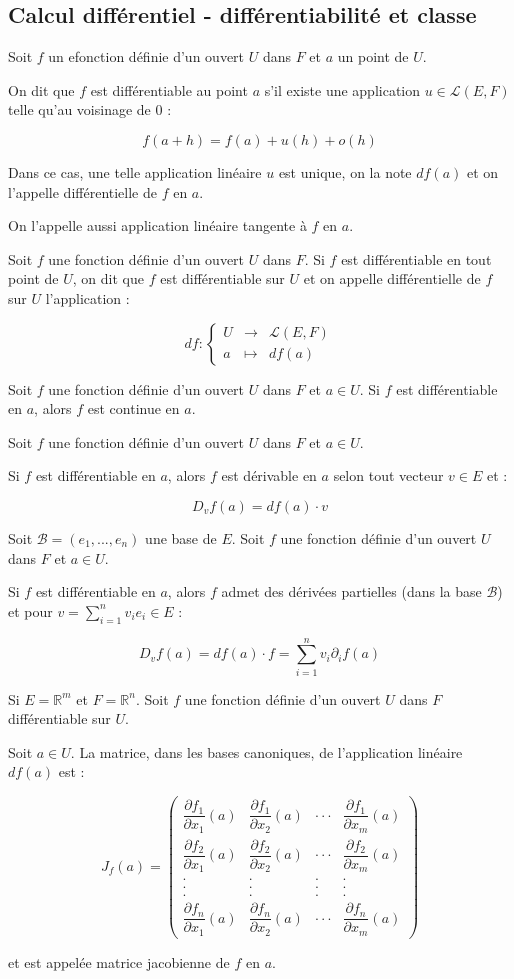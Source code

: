 \documentclass[a4paper,12pt]{book}
\newcommand{\Def}[2]{\begin{tcolorbox}[colback=white,colframe=red!10!green!20!blue!75!, title=Définition : #1]#2\end{tcolorbox}}
\newcommand{\Thr}[2]{\begin{tcolorbox}[sharp corners, colback=white,colframe=red!10!blue!30!green!75!, title=Théorème : #1]#2\end{tcolorbox}}
\def\R{\mathbb{R}}
\begin{document}
\subsection{Calcul différentiel - différentiabilité et classe}
\Def{}{Soit $f$ un efonction définie d'un ouvert $U$ dans $F$ et $a$ un point de $U$.
\par On dit que $f$ est différentiable au point $a$ s'il existe une application $u\in\mathcal{L}(E,F)$ telle qu'au voisinage de $0$ :
\par $$f(a+h) = f(a) + u(h) + o(h)$$
\par Dans ce cas, une telle application linéaire $u$ est unique, on la note $df(a)$ et on l'appelle différentielle de $f$ en $a$.
\par On l'appelle aussi application linéaire tangente à $f$ en $a$.}
\Def{}{Soit $f$ une fonction définie d'un ouvert $U$ dans $F$. Si $f$ est différentiable en tout point de $U$, on dit que $f$ est différentiable sur $U$ et on appelle différentielle de $f$ sur $U$ l'application :
\par $$df:\left\{\begin{array}{rcl}U & \to & \mathcal{L}(E,F) \\ a & \mapsto & df(a)\end{array}\right.$$}
\Thr{}{Soit $f$ une fonction définie d'un ouvert $U$ dans $F$ et $a\in U$.
Si $f$ est différentiable en $a$, alors $f$ est continue en $a$.}
\Thr{}{Soit $f$ une fonction définie d'un ouvert $U$ dans $F$ et $a\in U$.
\par Si $f$ est différentiable en $a$, alors $f$ est dérivable en $a$ selon tout vecteur $v\in E$ et :
\par $$D_vf(a) = df(a)\cdot v$$}
\Thr{Corollaire}{Soit $\mathcal{B}=(e_1,..., e_n)$ une base de $E$. Soit $f$ une fonction définie d'un ouvert $U$ dans $F$ et $a\in U$.
\par Si $f$ est différentiable en $a$, alors $f$ admet des dérivées partielles (dans la base $\mathcal{B}$) et pour $v=\sum\limits_{i=1}^nv_ie_i\in E$ :
\par $$D_vf(a) = df(a)\cdot f = \sum\limits_{i=1}^nv_i\partial_if(a)$$}
\Def{Matrice Jacobienne}{Si $E=\R^m$ et $F=\R^n$. Soit $f$ une fonction définie d'un ouvert $U$ dans $F$ différentiable sur $U$.
\par Soit $a\in U$. La matrice, dans les bases canoniques, de l'application linéaire $df(a)$ est :
\par $$J_f(a) = \begin{pmatrix} \dfrac{\partial f_1}{\partial x_1}(a) & \dfrac{\partial f_1}{\partial x_2}(a) & \cdot\cdot\cdot & \dfrac{\partial f_1}{\partial x_m}(a)
\\ \dfrac{\partial f_2}{\partial x_1}(a) & \dfrac{\partial f_2}{\partial x_2}(a) & \cdot\cdot\cdot & \dfrac{\partial f_2}{\partial x_m}(a)
\\ . & . & . & .
\\ . & . & . & .
\\ . & . & . & .
\\ \dfrac{\partial f_n}{\partial x_1}(a) & \dfrac{\partial f_n}{\partial x_2}(a) & \cdot\cdot\cdot & \dfrac{\partial f_n}{\partial x_m}(a)\end{pmatrix}$$
\par et est appelée matrice jacobienne de $f$ en $a$.}
\end{document}
